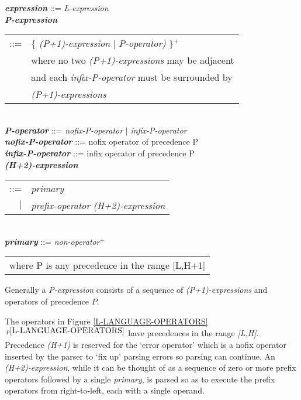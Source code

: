 \documentclass[12pt]{article}
\newcommand{\PLUS}[1][]{{$^{+#1}$}}
\newcommand{\emkey}[1]{{\em \bfseries #1}}
\newcommand{\itemref}[1]{\ref{#1}$\,^{p\pageref{#1}}$}
\newenvironment{indpar}[1][0.3in]%
	{\begin{list}{}%
		     {\setlength{\itemsep}{0in}%
		      \setlength{\topsep}{0in}%
		      \setlength{\parsep}{1ex}%
		      \setlength{\labelwidth}{#1}%
		      \setlength{\leftmargin}{#1}%
		      \addtolength{\leftmargin}{\labelsep}}%
	 \item}%
	{\end{list}}
\begin{document}
\begin{indpar}\begin{minipage}{6in}
\emkey{expression}\label{EXPRESSION} ::= {\em L-expression}
\\[0.5ex]
\emkey{P-expression}
    \begin{tabular}[t]{@{}rl}
    ::= & \{ {\em (P+1)-expression} $|$ {\em P-operator)} \}\PLUS{} \\
        & where no two {\em (P+1)-expressions} may be adjacent \\ 
        & and each {\em infix-P-operator} must be surrounded by \\
	& {\em (P+1)-expressions} \\
    \end{tabular}
\\[0.5ex]
\emkey{P-operator} ::= {\em nofix-P-operator} $|$ {\em infix-P-operator}
\\[0.5ex]
\emkey{nofix-P-operator} ::= nofix operator of precedence P
\\[0.5ex]
\emkey{infix-P-operator} ::= infix operator of precedence P
\\[0.5ex]
\emkey{(H+2)-expression}
    \begin{tabular}[t]{@{}rl}
    ::= & {\em primary} \\
    $|$ & {\em prefix-operator} {\em (H+2)-expression} \\
    \end{tabular}
\\[0.5ex]
\emkey{primary} ::= {\em non-operator}\PLUS{}
\\[2.0ex]
\hspace*{3em}\begin{tabular}{l}
where P is any precedence in the range [L,H+1]
\end{tabular}
\end{minipage}\end{indpar}

Generally
a {\em P-expression} consists of a sequence of {\em (P+1)-expressions}
and operators of precedence $P$.

The operators in Figure \itemref{L-LANGUAGE-OPERATORS} have precedences in
the range {\em [L,H]}.
Precedence {\em (H+1)} is reserved for the `error operator' which is a
nofix operator inserted by the parser to `fix up' parsing errors
so parsing can continue.
An {\em (H+2)-expression}, while it can be thought of as a sequence
of zero or more prefix operators followed by a single {\em primary},
is parsed so as to execute the prefix operators from right-to-left, each
with a single operand.
\end{document}
